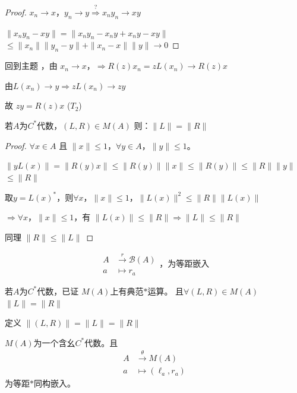 \documentclass[lang=cn,a4paper,newtx,section]{elegantbook}
\begin{document}
\begin{proof}
  $x_n \longrightarrow x$，$y_n \longrightarrow y \stackrel{?}{\Rightarrow} x_n y_n \longrightarrow xy$
  
  $\|x_n y_n - xy\| = \|x_n y_n - x_n y + x_n y - xy\|$
  $\leq \|x_n\| \|y_n - y\| + \|x_n - x\| \|y\| \longrightarrow 0$
\end{proof}


 
  回到主题
  ，由 $x_n \longrightarrow x$，$\Rightarrow R(z)x_n =zL(x_n)\longrightarrow R(z)x$
  
 
  
  由$L(x_n) \longrightarrow y \Rightarrow zL(x_n) \longrightarrow zy$
  
  故 $zy = R(z)x$ ($T_2$) 


\begin{proposition}
  若$A$为$C^*$代数，$(L, R) \in M(A)$
    则：$\|L\| = \|R\|$
\end{proposition}

\begin{proof}
  $\forall x \in A$ 且 $\|x\| \leq 1$，$\forall y \in A$，$\|y\| \leq 1$。
  
  $\|yL(x)\| = \|R(y)x\| \leq \|R(y)\| \|x\| \leq \|R(y)\| \leq \|R\| \|y\|$
  $\leq \|R\|$ 
  
  取$y = L(x)^*$，则$\forall x$，$\|x\| \leq 1$，$\|L(x)\|^2 \leq \|R\| \|L(x)\|$
  
  $\Rightarrow \forall x$，$\|x\| \leq 1$，有 $\|L(x)\| \leq \|R\| \Rightarrow \|L\| \leq \|R\|$
  
  同理 $\|R\| \leq \|L\|$
\end{proof}

\begin{remark}
  \begin{equation*}
    \begin{aligned}
      A &\xrightarrow{r} \mathcal{B}(A)  \\
      a &\longmapsto r_a
    \end{aligned}\text{，为等距嵌入}
  \end{equation*}
\end{remark}

\begin{definition}
  若$A$为$C^*$代数，已证 $M(A)$上有典范$*$运算。 且$\forall (L, R) \in M(A)$ $\|L\| = \|R\|$
  
  定义 $\|(L, R)\| = \|L\| = \|R\|$
\end{definition}

\begin{theorem}
  $M(A)$为一个含幺$C^*$代数。且
  \begin{equation*}
    \begin{aligned}
      A &\xrightarrow{\theta} M(A) \\
      a &\longmapsto (\ell_a, r_a)
    \end{aligned}
  \end{equation*}
  为等距$*$同构嵌入。
\end{theorem}
\end{document}
